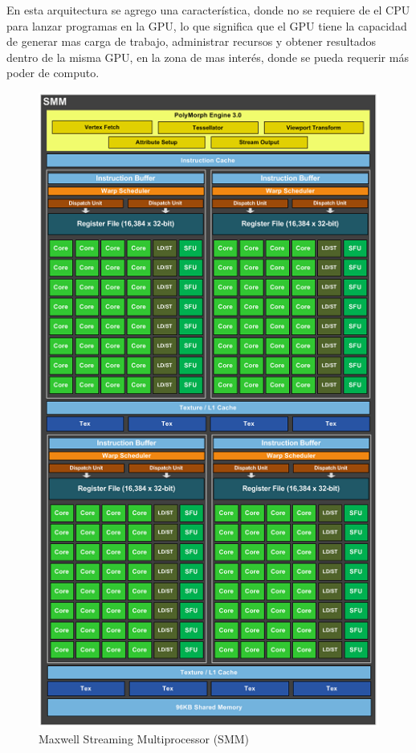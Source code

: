 En esta arquitectura se agrego una característica, donde no se requiere de el CPU para lanzar programas en la GPU, lo que significa que el GPU tiene la capacidad de generar mas carga de trabajo, administrar recursos y obtener resultados dentro de la misma GPU, en la zona de mas interés, donde se pueda requerir más poder de computo. 

\begin{figure}[h]
			\centering
				\includegraphics[scale=0.45]{img/MaxwellSM.png}
			\caption{Maxwell Streaming Multiprocessor (SMM)}
\end{figure}



